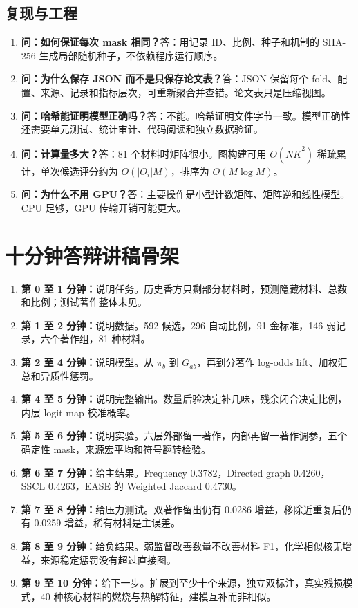 \documentclass[UTF8,11pt,openany,fontset=none]{ctexbook}
\newcommand{\SSCL}{\textsc{SSCL}}
\begin{document}
\section{复现与工程}

\begin{enumerate}[resume]
\item \textbf{问：如何保证每次 mask 相同？}\quad 答：用记录 ID、比例、种子和机制的 SHA-256 生成局部随机种子，不依赖程序运行顺序。
\item \textbf{问：为什么保存 JSON 而不是只保存论文表？}\quad 答：JSON 保留每个 fold、配置、来源、记录和指标层次，可重新聚合并查错。论文表只是压缩视图。
\item \textbf{问：哈希能证明模型正确吗？}\quad 答：不能。哈希证明文件字节一致。模型正确性还需要单元测试、统计审计、代码阅读和独立数据验证。
\item \textbf{问：计算量多大？}\quad 答：81 个材料时矩阵很小。图构建可用 $O(N\bar K^2)$ 稀疏累计，单次候选评分约为 $O(|O_i|M)$，排序为 $O(M\log M)$。
\item \textbf{问：为什么不用 GPU？}\quad 答：主要操作是小型计数矩阵、矩阵逆和线性模型。CPU 足够，GPU 传输开销可能更大。
\end{enumerate}

\chapter{十分钟答辩讲稿骨架}

\begin{enumerate}
\item \textbf{第 0 至 1 分钟：}说明任务。历史香方只剩部分材料时，预测隐藏材料、总数和比例；测试著作整体未见。
\item \textbf{第 1 至 2 分钟：}说明数据。592 候选，296 自动比例，91 金标准，146 弱记录，六个著作组，81 种材料。
\item \textbf{第 2 至 4 分钟：}说明模型。从 $\pi_b$ 到 $G_{ab}$，再到分著作 log-odds lift、加权汇总和异质性惩罚。
\item \textbf{第 4 至 5 分钟：}说明完整输出。数量后验决定补几味，残余闭合决定比例，内层 logit map 校准概率。
\item \textbf{第 5 至 6 分钟：}说明实验。六层外部留一著作，内部再留一著作调参，五个确定性 mask，来源宏平均和符号翻转检验。
\item \textbf{第 6 至 7 分钟：}给主结果。Frequency 0.3782，Directed graph 0.4260，\SSCL{} 0.4263，EASE 的 Weighted Jaccard 0.4730。
\item \textbf{第 7 至 8 分钟：}给压力测试。双著作留出仍有 0.0286 增益，移除近重复后仍有 0.0259 增益，稀有材料是主误差。
\item \textbf{第 8 至 9 分钟：}给负结果。弱监督改善数量不改善材料 F1，化学相似核无增益，来源稳定惩罚没有超过直接图。
\item \textbf{第 9 至 10 分钟：}给下一步。扩展到至少十个来源，独立双标注，真实残损模式，40 种核心材料的燃烧与热解特征，建模互补而非相似。
\end{enumerate}
\end{document}
